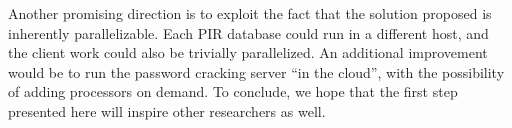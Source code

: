 \documentclass{llncs}
\begin{document}
Another promising direction is to exploit the fact that
the solution proposed is inherently parallelizable. 
Each PIR database could run in a different host, 
and the client work could also be trivially parallelized.
An additional improvement would be to run the password cracking server ``in the cloud'',
with the possibility of adding processors on demand.
To conclude, we hope that the first step presented here will inspire other researchers as well.



{}

\end{document}
